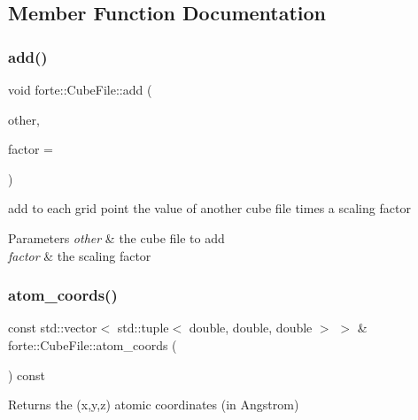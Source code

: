 \subsection{Member Function Documentation}
\mbox{\label{classforte_1_1_cube_file_a79768e0f554988aa44df4136dc6bdf38}} 
\subsubsection{\texorpdfstring{add()}{add()}}
{\footnotesize\ttfamily void forte\+::\+Cube\+File\+::add (\begin{DoxyParamCaption}\item[{const \mbox{\hyperlink{classforte_1_1_cube_file}{Cube\+File}} \&}]{other,  }\item[{double}]{factor = {} }\end{DoxyParamCaption})}



add to each grid point the value of another cube file times a scaling factor 


\begin{DoxyParams}{Parameters}
{\em other} & the cube file to add \\
\hline
{\em factor} & the scaling factor \\
\hline
\end{DoxyParams}
\mbox{\label{classforte_1_1_cube_file_aa443cf8e4c16f88cea31d5082c73b83d}} 
\subsubsection{\texorpdfstring{atom\+\_\+coords()}{atom\_coords()}}
{\footnotesize\ttfamily const std\+::vector$<$ std\+::tuple$<$ double, double, double $>$ $>$ \& forte\+::\+Cube\+File\+::atom\+\_\+coords (\begin{DoxyParamCaption}{ }\end{DoxyParamCaption}) const}

\begin{DoxyReturn}{Returns}
the (x,y,z) atomic coordinates (in Angstrom) 
\end{DoxyReturn}
\mbox{\label{classforte_1_1_cube_file_a2b6769f5f719e86ef637badec2b0cff1}} 
